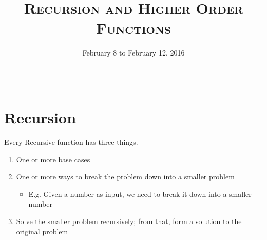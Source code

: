 \documentclass{exam}
\title{\textsc{Recursion and Higher Order Functions}}
\date{February 8 to February 12, 2016}
\begin{document}
\maketitle
\rule{\textwidth}{0.15em}
\fontsize{12}{15}\selectfont


\section{Recursion}

Every Recursive function has three things.
\begin{enumerate}
\item One or more base cases
\item One or more ways to break the problem down into a smaller problem
\begin{itemize}
\item E.g. Given a number as input, we need to break it down into a smaller number
\end{itemize}
\item Solve the smaller problem recursively; from that, form a solution to the original problem
\end{enumerate}
\end{document}
